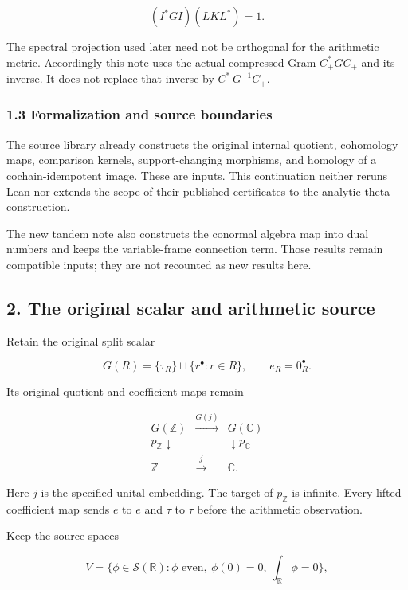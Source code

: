 \[
(I^*GI)(LKL^*)=1.
\]

The spectral projection used later need not be orthogonal for the
arithmetic metric. Accordingly this note uses the actual compressed Gram
\(C_+^*GC_+\) and its inverse. It does not replace that inverse by
\(C_+^*G^{-1}C_+\).

\subsubsection{1.3 Formalization and source
boundaries}\label{exterior_trace:formalization-and-source-boundaries}

The source library already constructs the original internal quotient,
cohomology maps, comparison kernels, support-changing morphisms, and
homology of a cochain-idempotent image. These are inputs. This
continuation neither reruns Lean nor extends the scope of their
published certificates to the analytic theta construction.

The new tandem note also constructs the conormal algebra map into dual
numbers and keeps the variable-frame connection term. Those results
remain compatible inputs; they are not recounted as new results here.

\subsection{2. The original scalar and arithmetic
source}\label{exterior_trace:the-original-scalar-and-arithmetic-source}

Retain the original split scalar

\[
G(R)=\{\tau_R\}\sqcup\{r^\bullet:r\in R\},
\qquad e_R=0_R^\bullet.
\]

Its original quotient and coefficient maps remain

\[
\boxed{
\begin{array}{ccc}
G(\mathbb Z)&\xrightarrow{G(j)}&G(\mathbb C)\\
p_{\mathbb Z}\downarrow&&\downarrow p_{\mathbb C}\\
\mathbb Z&\xrightarrow{j}&\mathbb C.
\end{array}
}
\]

Here \(j\) is the specified unital embedding. The target of
\(p_{\mathbb Z}\) is infinite. Every lifted coefficient map sends \(e\)
to \(e\) and \(\tau\) to \(\tau\) before the arithmetic observation.

Keep the source spaces

\[
V=\{\phi\in\mathcal S(\mathbb R):\phi\text{ even},\ \phi(0)=0,\ \int_{\mathbb R}\phi=0\},
\]

